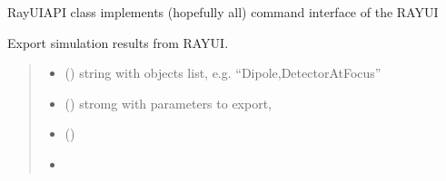 \documentclass[letterpaper,10pt,english]{sphinxmanual}
\begin{document}
\begin{fulllineitems}
\label{\detokenize{API:raypyng.runner.RayUIAPI}}
\pysigstartsignatures
\pysiglinewithargsret
{}
{}
{}
\pysigstopsignatures
\sphinxAtStartPar
RayUIAPI class implements (hopefully all) command interface of the RAY\sphinxhyphen{}UI

\begin{fulllineitems}
\label{\detokenize{API:raypyng.runner.RayUIAPI.export}}
\pysigstartsignatures
\pysiglinewithargsret
{}
{\sphinxparamcomma {}\sphinxparamcomma {}\sphinxparamcomma {}\sphinxparamcomma {}}
{}
\pysigstopsignatures
\sphinxAtStartPar
Export simulation results from RAY\sphinxhyphen{}UI.
\begin{quote}\begin{description}
\begin{itemize}
\item {} 
\sphinxAtStartPar
{} () \textendash{} string with objects list, e.g. “Dipole,DetectorAtFocus”

\item {} 
\sphinxAtStartPar
{} () \textendash{} stromg with parameters to export,

\item {} 
\sphinxAtStartPar
{} ()

\item {} 
\sphinxAtStartPar
{}


\end{itemize}
\end{description}
\end{quote}
\end{fulllineitems}
\end{fulllineitems}
\end{document}
